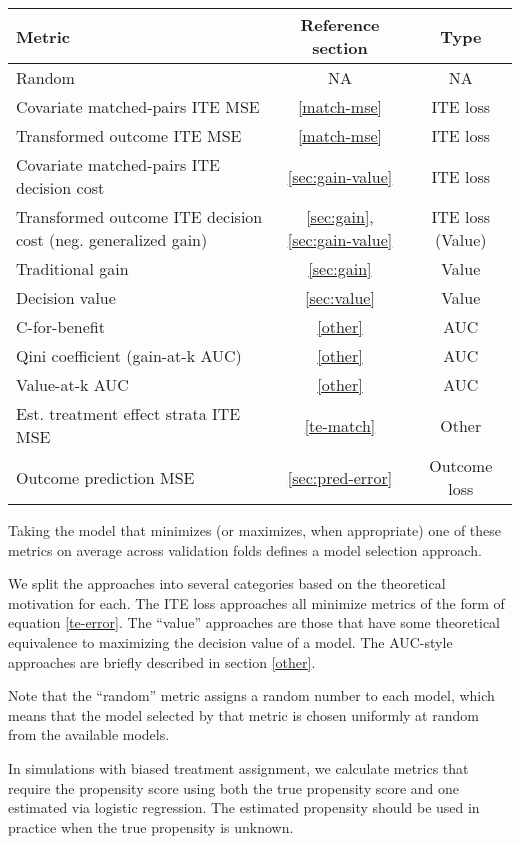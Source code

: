 \begin{center}
\begin{tabu}{|m{6cm}|c|c|}
	\hline
	 \rowfont[c]{\bfseries} Metric & Reference section & Type \\
	 \hline
	 Random & NA &  NA \\
	 \hline
	 Covariate matched-pairs ITE MSE & \ref{match-mse} & ITE loss \\
	 Transformed outcome ITE MSE & \ref{match-mse} & ITE loss \\
	 Covariate matched-pairs ITE decision cost &  \ref{sec:gain-value} & ITE loss \\
	 Transformed outcome ITE decision cost (neg. generalized gain) &  \ref{sec:gain}, \ref{sec:gain-value} & ITE loss (Value) \\
	 \hline
	 Traditional gain &  \ref{sec:gain} & Value \\ 
	 Decision value &  \ref{sec:value} & Value \\
	 \hline
	 C-for-benefit &  \ref{other} & AUC \\
	 Qini coefficient (gain-at-k AUC) &  \ref{other} & AUC \\
	 Value-at-k AUC &  \ref{other} & AUC \\
	 \hline
	 Est. treatment effect strata ITE MSE &  \ref{te-match} & Other \\
	 \hline
	 Outcome prediction MSE &  \ref{sec:pred-error} & Outcome loss \\
	 \hline
\end{tabu}
\end{center}

Taking the model that minimizes (or maximizes, when appropriate) one of these metrics on average across validation folds defines a model selection approach. 

We split the approaches into several categories based on the theoretical motivation for each. The ITE loss approaches all minimize metrics of the form of equation \ref{te-error}. The ``value'' approaches are those that have some theoretical equivalence to maximizing the decision value of a model. The AUC-style approaches are briefly described in section \ref{other}. 

Note that the ``random'' metric assigns a random number to each model, which means that the model selected by that metric is chosen uniformly at random from the available models. 

In simulations with biased treatment assignment, we calculate metrics that require the propensity score using both the true propensity score and one estimated via logistic regression. The estimated propensity should be used in practice when the true propensity is unknown.

